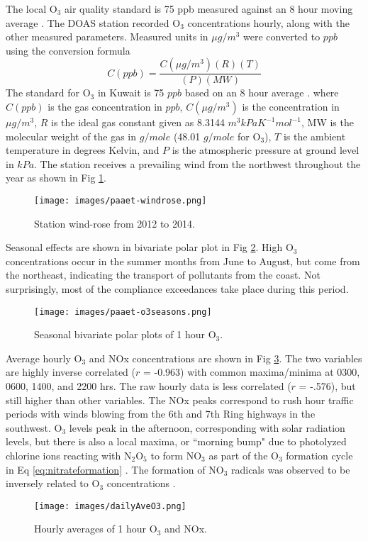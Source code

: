 \documentclass[preprint,12pt,a4paper,authoryear]{elsarticle}
\begin{document}
\begin{linenumbers}
%
The local O$_{3}$ air quality standard is 75 ppb measured against an 8 hour moving average \citep{KEPA2017}. The DOAS station recorded O$_{3}$ concentrations hourly, along with the other measured parameters. Measured units in $\mu g/m^{3}$ were converted to $ppb$ using the conversion formula
%
\begin{equation}
\label{eq:gasequation}
C(ppb) = \frac{C(\mu g/m^{3})(R) (T)}{(P) (MW)}
\end{equation}
%
The standard for O$_{3}$ in Kuwait is 75 $ppb$ based on an 8 hour average \citep{KEPA2017}.
\noindent
where $C(ppb)$ is the gas concentration in $ppb$, $C(\mu g/m^{3})$ is the concentration in $\mu g/m^{3}$, $R$ is the ideal gas constant given as 8.3144 $m^{3}kPa K^{-1}mol^{-1}$, MW is the molecular weight of the gas in $g/mole$ (48.01 $g/mole$ for O$_{3}$), $T$ is the ambient temperature in degrees Kelvin, and $P$ is the atmospheric pressure at ground level in $kPa$. The station receives a prevailing wind from the northwest throughout the year as shown in Fig \ref{fig:windrose}.
%
\begin{figure}[H]
\centering
\texttt{[image: images/paaet-windrose.png]}  %
\caption{Station wind-rose from 2012 to 2014.}
\label{fig:windrose}
\end{figure}
%
Seasonal effects are shown in bivariate polar plot in Fig \ref{fig:bipolarplots}. High O$_{3}$ concentrations occur in the summer months from June to August, but come from the northeast, indicating the transport of pollutants from the coast. Not surprisingly, most of the compliance exceedances take place during this period.
%
\begin{figure}[H]
\centering
\texttt{[image: images/paaet-o3seasons.png]}  %
\caption{Seasonal bivariate polar plots of 1 hour O$_3$.}
\label{fig:bipolarplots}
\end{figure}
%
Average hourly O$_{3}$ and NOx concentrations are shown in Fig \ref{fig:hourlyAveO3}. The two variables are highly inverse correlated ($r$ = -0.963) with common maxima/minima at 0300, 0600, 1400, and 2200 hrs. The raw hourly data is less correlated ($r$ = -.576), but still higher than other variables. The NOx peaks correspond to rush hour traffic periods with winds blowing from the 6th and 7th Ring highways in the southwest. O$_{3}$ levels peak in the afternoon, corresponding with solar radiation levels, but there is also a local maxima, or ``morning bump" due to photolyzed chlorine ions reacting with N$_{2}$O$_{5}$ to form NO$_{3}$ as part of the O$_{3}$ formation cycle in Eq \ref{eq:nitrateformation} \citep{Calvert2015}. The formation of NO$_{3}$ radicals was observed to be inversely related to O$_{3}$ concentrations \citep{Song2011}.
%
\begin{figure}[H]
\centering
\texttt{[image: images/dailyAveO3.png]}  %
\caption{Hourly averages of 1 hour O$_{3}$ and NOx.}
\label{fig:hourlyAveO3}
\end{figure}
%


\end{linenumbers}
\end{document}
